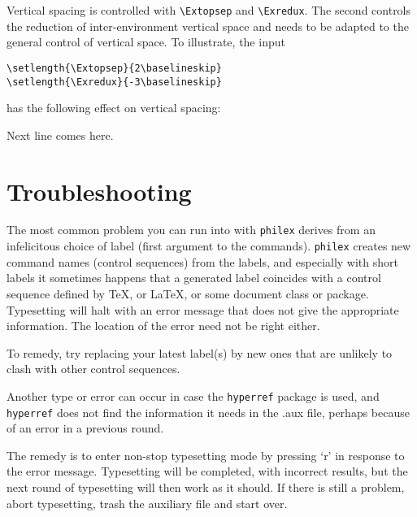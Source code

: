 \documentclass[10pt]{article}
\newcommand{\qut}[1]{`#1'}
\begin{document}
\setlength{\Exlabelsep}{1.3em}
\phlabeldefault


Vertical spacing is controlled with \verb+\Extopsep+ and \verb+\Exredux+. The second controls the reduction of inter-environment vertical space and needs to be adapted to the general control of vertical space. To illustrate, the input

\begin{verbatim}
\setlength{\Extopsep}{2\baselineskip}
\setlength{\Exredux}{-3\baselineskip}
\end{verbatim}
	has the following effect on vertical spacing:
	 
\setlength{\Extopsep}{2\baselineskip}
\setlength{\Exredux}{-3\baselineskip}

	Next line comes here.

\setlength{\Extopsep}{.66\baselineskip}
\setlength{\Exredux}{-1\baselineskip}


\section{Troubleshooting}
The most  common problem you can run into with \verb+philex+ derives from an infelicitous choice of label (first argument to the commands). \verb+philex+ creates new command names (control sequences) from the labels, and especially with short labels it sometimes happens that a generated label coincides with a control sequence defined by TeX, or LaTeX, or some document class or package. Typesetting will halt with an error message that does not give the appropriate information. The location of the error need not be right either.

To remedy, try replacing your latest label(s) by new ones that are unlikely to clash with other control sequences.

Another type or error  can occur in case the \verb+hyperref+ package is used, and \verb+hyperref+ does not find the information it needs in the .aux file, perhaps because of an error in a previous round.

The remedy is to enter non-stop typesetting mode by pressing \qut{r} in response to the error message. Typesetting will be completed, with incorrect results, but the next round of typesetting will then work as it should. If there is still a problem, abort typesetting, trash the auxiliary file and start over.
\end{document}
